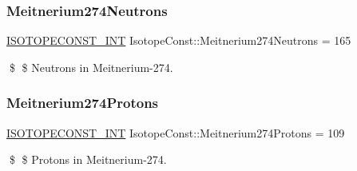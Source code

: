\subsubsection{\texorpdfstring{Meitnerium274\+Neutrons}{Meitnerium274Neutrons}}
{\footnotesize\ttfamily \mbox{\hyperlink{group___isotope_const-_macros_ga5f18360b3e99483a35c32d789e62621c}{I\+S\+O\+T\+O\+P\+E\+C\+O\+N\+S\+T\+\_\+\+I\+NT}} Isotope\+Const\+::\+Meitnerium274\+Neutrons = 165}

\$ \$ Neutrons in Meitnerium-\/274. \mbox{\label{group___isotope_const-_meitnerium-_mt274_gaafa0761c1d597b8ae19b46962a7c8b8d}} 
\subsubsection{\texorpdfstring{Meitnerium274\+Protons}{Meitnerium274Protons}}
{\footnotesize\ttfamily \mbox{\hyperlink{group___isotope_const-_macros_ga5f18360b3e99483a35c32d789e62621c}{I\+S\+O\+T\+O\+P\+E\+C\+O\+N\+S\+T\+\_\+\+I\+NT}} Isotope\+Const\+::\+Meitnerium274\+Protons = 109}

\$ \$ Protons in Meitnerium-\/274. 